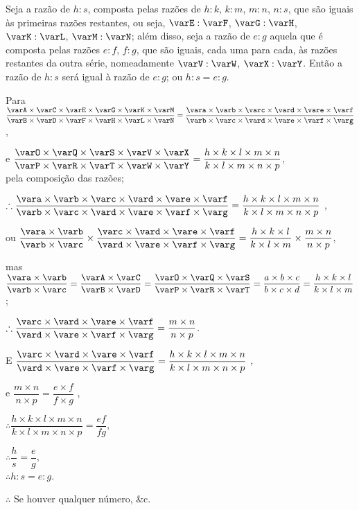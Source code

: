 \documentclass[booklanguage=brazilian]{byrnebook}
\begin{document}
Seja a razão de $h : s$, composta pelas razões de $h : k$, $k : m$, $m : n$, $n : s$, que são iguais às primeiras razões restantes, ou seja, $\varE : \varF$, $\varG : \varH$, $\varK : \varL$, $\varM : \varN$; além disso, seja a razão de $e : g$ aquela que é composta pelas razões $e : f$, $f : g$, que são iguais, cada uma para cada, às razões restantes da outra série, nomeadamente $\varV : \varW$, $\varX : \varY$. Então a razão de $h : s$ será igual à razão de $e : g$; ou $h : s = e : g$.

\begin{center}
Para $\dfrac
{\varA \times \varC \times \varE \times \varG \times \varK \times \varM}
{\varB \times \varD \times \varF \times \varH \times \varL \times \varN}
=
\dfrac
{\vara \times \varb \times \varc \times \vard \times \vare \times \varf}
{\varb \times \varc \times \vard \times \vare \times \varf \times \varg}$,

e $\dfrac
{\varO \times \varQ \times \varS \times \varV \times \varX}
{\varP \times \varR \times \varT \times \varW \times \varY}
=
\dfrac
{h \times k \times l \times m \times n}
{k \times l \times m \times n \times p}$,\\
pela composição das razões;

$\therefore \dfrac
{\vara \times \varb \times \varc \times \vard \times \vare \times \varf}
{\varb \times \varc \times \vard \times \vare \times \varf \times \varg}
=
\dfrac
{h \times k \times l \times m \times n}
{k \times l \times m \times n \times p}$ \byref{\hypref},

ou $\dfrac{\vara \times \varb}{\varb \times \varc}
\times
\dfrac
{\varc \times \vard \times \vare \times \varf}
{\vard \times \vare \times \varf \times \varg}
=
\dfrac
{h \times k \times l}
{k \times l \times m}
\times
\dfrac
{m \times n}
{n \times p}$,

mas $\dfrac{\vara \times \varb}{\varb \times \varc} = \dfrac{\varA \times \varC}{\varB \times \varD}
=
\dfrac
{\varO \times \varQ \times \varS}
{\varP \times \varR \times \varT}
=
\dfrac{a \times b \times c}{b \times c \times d}
=
\dfrac{h \times k \times l}{k \times l \times m}$;

$\therefore
\dfrac
{\varc \times \vard \times \vare \times \varf}
{\vard \times \vare \times \varf \times \varg}
=
\dfrac
{m \times n}
{n \times p}$.

E $\dfrac
{\varc \times \vard \times \vare \times \varf}
{\vard \times \vare \times \varf \times \varg}
= \dfrac
{h \times k \times l \times m \times n}
{k \times l \times m \times n \times p}$ \byref{\hypref},

e $\dfrac
{m \times n}
{n \times p}
=
\dfrac
{e \times f}
{f \times g}$ \byref{\hypref},

$\therefore \dfrac
{h \times k \times l \times m \times n}
{k \times l \times m \times n \times p}
= \dfrac{e f}{f g}$,

$\therefore \dfrac{h}{s} = \dfrac{e}{g}$,\\
$\therefore h : s = e : g$.

$\therefore$ Se houver qualquer número, \&c.
\end{center}
\end{document}
